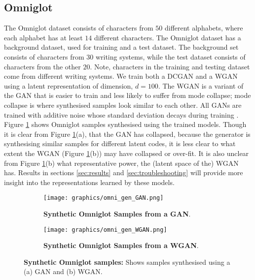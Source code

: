 \documentclass[journal]{IEEEtran}
\begin{document}
\subsection{Omniglot}
The Omniglot dataset \cite{lake2015human} consists of characters from $50$ different alphabets, where each alphabet has at least $14$ different characters. The Omniglot dataset has a background dataset, used for training and a test dataset. The background set consists of characters from $30$ writing systems, while the test dataset consists of characters from the other $20$. Note, characters in the training and testing dataset come from different writing systems. We train both a DCGAN \cite{radford2015unsupervised} and a WGAN \cite{arjovsky2017wasserstein} using a latent representation of dimension, $d=100$. The WGAN \cite{arjovsky2017wasserstein} is a variant of the GAN that is easier to train and less likely to suffer from mode collapse; mode collapse is where synthesised samples look similar to each other. All GANs are trained with additive noise whose standard deviation decays during training \cite{arjovsky2017towards}.  Figure \ref{fig:omni_gen} shows Omniglot samples synthesised using the trained models. Though it is clear from Figure \ref{fig:omni_gen}(a), that the GAN has collapsed, because the generator is synthesising similar samples for different latent codes, it is less clear to what extent the WGAN  (Figure \ref{fig:omni_gen}(b)) may have collapsed or over-fit. It is also unclear from Figure \ref{fig:omni_gen}(b) what representative power, the (latent space of the)  WGAN has. Results in sections \ref{sec:results} and \ref{sec:troubleshooting} will provide more insight into the representations learned by these models.


\begin{figure}
\centering 
    \begin{subfigure}{\columnwidth}
    \texttt{[image: graphics/omni\_gen\_GAN.png]} %
    \caption{\textbf{Synthetic Omniglot Samples from a GAN}.}
    \end{subfigure}
    \begin{subfigure}{\columnwidth}
    \texttt{[image: graphics/omni\_gen\_WGAN.png]}
    \caption{\textbf{Synthetic Omniglot Samples from a WGAN}.} %
    \end{subfigure}
\centering
\caption{\textbf{Synthetic Omniglot samples:} Shows samples synthesised using a (a) GAN and (b) WGAN.}
\label{fig:omni_gen}
\end{figure}
\end{document}
